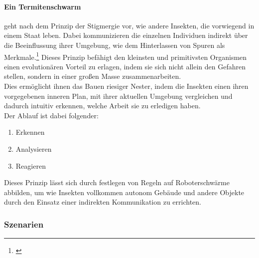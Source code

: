 \paragraph{Ein Termitenschwarm} geht nach dem Prinzip der Stigmergie vor, wie andere Insekten, die vorwiegend in einem Staat leben. Dabei kommunizieren die einzelnen Individuen indirekt über die Beeinflussung ihrer Umgebung, wie dem Hinterlassen von Spuren als Merkmale.\footnote{\citep[vgl.][Roboter bauen im Schwarm nach dem Vorbild von Termiten]{Schoenebeck.Roboterbauen}\label{note48}} Dieses Prinzip befähigt den kleinsten und primitivsten Organismen einen evolutionären Vorteil zu erlagen, indem sie sich nicht allein den Gefahren stellen, sondern in einer großen Masse zusammenarbeiten.\\
Dies ermöglicht ihnen das Bauen riesiger Nester, indem die Insekten einen ihren vorgegebenen inneren Plan, mit ihrer aktuellen Umgebung vergleichen und dadurch intuitiv erkennen, welche Arbeit sie zu erledigen haben.\\

\noindent
Der Ablauf ist dabei folgender:
\begin{enumerate}
	\item Erkennen
	\item Analysieren
	\item Reagieren
\end{enumerate}
Dieses Prinzip lässt sich durch festlegen von Regeln auf Roboterschwärme abbilden, um wie Insekten vollkommen autonom Gebäude und andere Objekte durch den Einsatz einer indirekten Kommunikation zu errichten.

\subsubsection{Szenarien}

